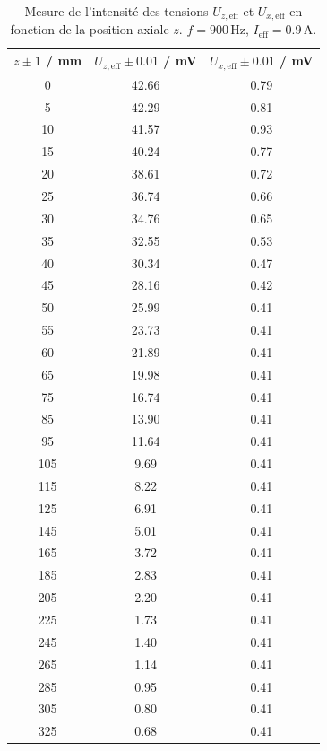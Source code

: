 \documentclass[a4paper,10pt]{article}
\begin{document}
\begin{table}[H]
\centering

\caption{
Mesure de l'intensité des tensions $U_{z,\mathrm{eff}}$ et
$U_{x,\mathrm{eff}}$ en fonction de la position axiale $z$.
$f = 900\,\mathrm{Hz}$,
$I_\mathrm{eff} = 0.9\,\mathrm{A}$.
}

\label{tab:comparaison_B}

\small

\begin{tabular}{
S[table-format=3.0]
S[table-format=2.2]
S[table-format=1.2]
}

\toprule

{$z \pm 1$ / mm} &
{$U_{z,\mathrm{eff}} \pm 0.01$ / mV} &
{$U_{x,\mathrm{eff}} \pm 0.01$ / mV} \\

\midrule

0   & 42.66 & 0.79 \\
5   & 42.29 & 0.81 \\
10  & 41.57 & 0.93 \\
15  & 40.24 & 0.77 \\
20  & 38.61 & 0.72 \\
25  & 36.74 & 0.66 \\
30  & 34.76 & 0.65 \\
35  & 32.55 & 0.53 \\
40  & 30.34 & 0.47 \\
45  & 28.16 & 0.42 \\
50  & 25.99 & 0.41 \\
55  & 23.73 & 0.41 \\
60  & 21.89 & 0.41 \\
65  & 19.98 & 0.41 \\
75  & 16.74 & 0.41 \\
85  & 13.90 & 0.41 \\
95  & 11.64 & 0.41 \\
105 & 9.69  & 0.41 \\
115 & 8.22  & 0.41 \\
125 & 6.91  & 0.41 \\
145 & 5.01  & 0.41 \\
165 & 3.72  & 0.41 \\
185 & 2.83  & 0.41 \\
205 & 2.20  & 0.41 \\
225 & 1.73  & 0.41 \\
245 & 1.40  & 0.41 \\
265 & 1.14  & 0.41 \\
285 & 0.95  & 0.41 \\
305 & 0.80  & 0.41 \\
325 & 0.68  & 0.41 \\

\bottomrule

\end{tabular}

\end{table}
\end{document}
